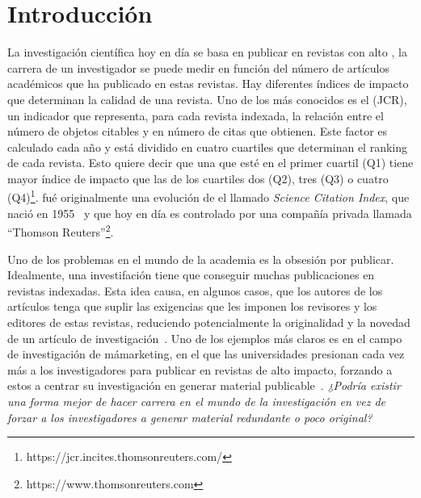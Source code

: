 \section{Introducción}

La investigación científica hoy en día se basa en publicar en revistas con alto
 \cite{doi:10.1001/jama.295.1.90}, la carrera de un
investigador se puede medir en función del número de artículos académicos que ha
publicado en estas revistas. Hay diferentes índices de impacto que determinan
la calidad de una revista. Uno de los más conocidos es el  (JCR), un indicador que representa, para cada revista indexada, la
relación entre el número de objetos citables y en número de citas que obtienen.
Este factor es calculado cada año y está dividido en cuatro cuartiles que
determinan el ranking de cada revista. Esto quiere decir que una que esté
en el primer cuartil (Q1) tiene mayor índice de impacto que las de los
cuartiles dos (Q2), tres (Q3) o cuatro
(Q4)\footnote{https://jcr.incites.thomsonreuters.com/}.  fué
originalmente una evolución de el llamado \emph{Science Citation Index}, que
nació en 1955~\cite{garfield2007evolution} y que hoy en día es controlado por
una compañía privada llamada ``Thomson
Reuters''\footnote{https://www.thomsonreuters.com}. 

Uno de los problemas en el mundo de la academia es la obsesión por publicar.
Idealmente, una investifación tiene que conseguir muchas publicaciones en
revistas indexadas. Esta idea causa, en algunos casos, que los autores de los
artículos tenga que suplir las exigencias que les imponen los revisores y los
editores de estas revistas, reduciendo potencialmente la originalidad y la
novedad de un artículo de investigación~\cite{Frey2003}. Uno de los ejemplos más
claros es en el campo de investigación de mámarketing, en el que las
universidades presionan cada vez más a los investigadores para publicar en
revistas de alto impacto, forzando a estos a centrar su investigación en generar
material publicable~\cite{ortinau2011writing}. \emph{ ¿Podría existir una forma
  mejor de hacer carrera en el mundo de la investigación en vez de forzar a los
  investigadores a generar material redundante o poco original?}

